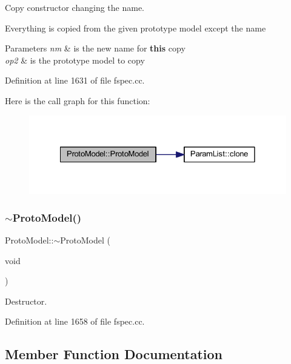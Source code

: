 Copy constructor changing the name. 

Everything is copied from the given prototype model except the name 
\begin{DoxyParams}{Parameters}
{\em nm} & is the new name for {\bfseries{this}} copy \\
\hline
{\em op2} & is the prototype model to copy \\
\hline
\end{DoxyParams}


Definition at line 1631 of file fspec.\+cc.

Here is the call graph for this function\+:
\nopagebreak
\begin{figure}[H]
\begin{center}
\leavevmode
\includegraphics[width=328pt]{class_proto_model_a6385c58ce2f155d13f506c64a7a03b11_cgraph}
\end{center}
\end{figure}
\mbox{\label{class_proto_model_ae253f61258ac2ad8f165200d1737e7a3}} 
\subsubsection{\texorpdfstring{$\sim$ProtoModel()}{~ProtoModel()}}
{\footnotesize\ttfamily Proto\+Model\+::$\sim$\+Proto\+Model (\begin{DoxyParamCaption}\item[{void}]{ }\end{DoxyParamCaption})\hspace{0.3cm}{\ttfamily [virtual]}}



Destructor. 



Definition at line 1658 of file fspec.\+cc.



\subsection{Member Function Documentation}
\mbox{\label{class_proto_model_a5c32e533f079fc91875ccd486f70f36e}} 
